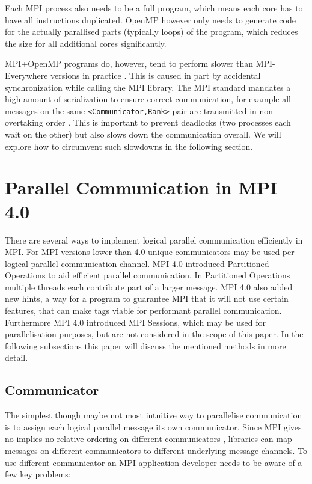 \documentclass[sigconf]{acmart}
\begin{document}
Each MPI process also needs to be a full program, which means each core has to have all instructions duplicated.
OpenMP however only needs to generate code for the actually parallised parts (typically loops) of the program, which reduces the size for all additional cores significantly.

MPI+OpenMP programs do, however, tend to perform slower than MPI-Everywhere versions in practice \cite{zambreLessonsLearned2022}.
This is caused in part by accidental synchronization while calling the MPI library.
The MPI standard mandates a high amount of serialization to ensure correct communication, for example all messages on the same \verb|<Communicator,Rank>| pair are transmitted in non-overtaking order \cite{mpi40}.
This is important to prevent deadlocks (two processes each wait on the other) but also slows down the communication overall.
We will explore how to circumvent such slowdowns in the following section.


\section{Parallel Communication in MPI 4.0}

There are several ways to implement logical parallel communication efficiently in MPI.
For MPI versions lower than 4.0 unique communicators may be used per logical parallel communication channel.
MPI 4.0 introduced Partitioned Operations to aid efficient parallel communication.
In Partitioned Operations multiple threads each contribute part of a larger message.
MPI 4.0 also added new hints, a way for a program to guarantee MPI that it will not use certain features, that can make tags viable for performant parallel communication.
Furthermore MPI 4.0 introduced MPI Sessions, which may be used for parallelisation purposes, but are not considered in the scope of this paper.
In the following subsections this paper will discuss the mentioned methods in more detail.

\subsection{Communicator}

The simplest though maybe not most intuitive way to parallelise communication is to assign each logical parallel message its own communicator.
Since MPI gives no implies no relative ordering on different communicators \cite{zambreLessonsLearned2022}, libraries can map messages on different communicators to different underlying message channels.
To use different communicator an MPI application developer needs to be aware of a few key problems:
\end{document}

